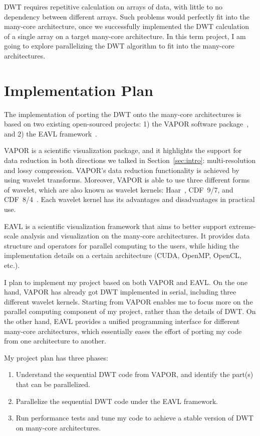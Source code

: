 \documentclass{article}
\begin{document}
DWT requires repetitive calculation on arrays of data, with little to no
dependency between different arrays.
%
Such problems would perfectly fit into the many-core architecture, once we
successfully implemented the DWT calculation of a single array on a 
target many-core architecture.
%
In this term project, I am going to explore parallelizing the DWT algorithm 
to fit into the many-core architectures.


\section{Implementation Plan}
The implementation of porting the DWT onto the many-core architectures
is based on two existing open-sourced projects: 1) the VAPOR software 
package~\cite{clyne2007interactive},
and 2) the EAVL framework~\cite{meredith2012distributed}.

VAPOR is a scientific visualization package, and it highlights the 
support for data reduction in both directions we talked in
Section~\ref{sec:intro}: multi-resolution and lossy compression.
%
VAPOR's data reduction functionality is achieved by using wavelet transforms.
%
Moreover, VAPOR is able to use three different forms of wavelet, which 
are also known as wavelet kernels: Haar~\cite{haar1910theorie}, 
CDF~9/7, and CDF~8/4~\cite{cohen1992biorthogonal}.
%
Each wavelet kernel has its advantages and disadvantages in practical use.

EAVL is a scientific visualization framework that aims to better support
extreme-scale analysis and visualization on the many-core architectures.
%
It provides data structure and operators for parallel computing to the 
users, while hiding the implementation details on a certain architecture
(CUDA, OpenMP, OpenCL, etc.).

I plan to implement my project based on both VAPOR and EAVL. 
%
On the one hand, VAPOR has already got DWT implemented in serial, 
including three different wavelet kernels.
%
Starting from VAPOR enables me to focus more on the parallel computing 
component of my project, rather than the details of DWT.
%
On the other hand, EAVL provides a unified programming interface for 
different many-core architectures, which essentially eases the effort
of porting my code from one architecture to another.

My project plan has three phases:
\begin{enumerate}
\item Understand the sequential DWT code from VAPOR, 
and identify the part(s) that can be parallelized.
%
\item Parallelize the sequential DWT code under the EAVL framework.
%
\item Run performance tests and tune my code to achieve a stable version
of DWT on many-core architectures.
\end{enumerate}
\end{document}
